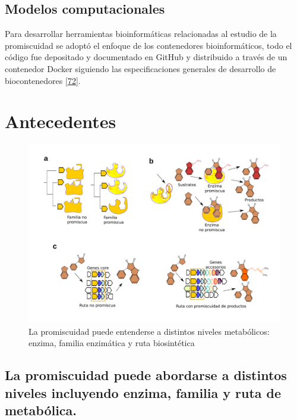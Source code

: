 \documentclass[12pt,twoside]{reedthesis}
\begin{document}
  \section{Modelos computacionales}\label{modelos-computacionales}
  
  Para desarrollar herramientas bioinformáticas relacionadas al estudio de
  la promiscuidad se adoptó el enfoque de los contenedores
  bioinformáticos, todo el código fue depositado y documentado en GitHub y
  distribuido a través de un contenedor Docker siguiendo las
  especificaciones generales de desarrollo de biocontenedores
  {[}\protect\hyperlink{ref-schulz_use_2016}{72}{]}.
  
  \clearpage  
  
  \chapter*{Antecedentes}\label{antecedentes}
  
  \begin{figure}[h!tbp]
  \centering
  \includegraphics[angle = 0,scale = 0.6]{chapter0/NivelesPromiscuidad.png}
  \caption[La promiscuidad puede entenderse a distintos niveles metabólicos: enzima, familia enzimática y ruta biosintética]{\normalsize{La promiscuidad puede entenderse a distintos niveles metabólicos: enzima, familia enzimática y ruta biosintética}}
  \label{fig:niveles}
  \end{figure}
  
  \section{La promiscuidad puede abordarse a distintos niveles incluyendo
  enzima, familia y ruta de
  metabólica.}\label{la-promiscuidad-puede-abordarse-a-distintos-niveles-incluyendo-enzima-familia-y-ruta-de-metabolica.}
  
\end{document}
